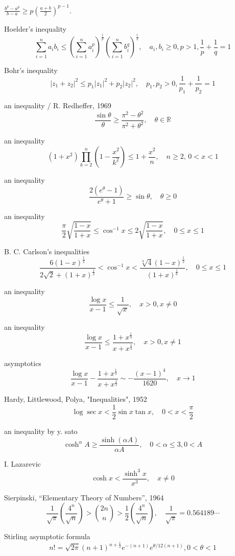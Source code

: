 $
\displaystyle \frac{b^p-a^p}{b-a} \ge p\left(\frac{a+b}{2}\right)^{p-1}.
$

Hoelder’s inequality
$$
\sum^n_{i=1}a_i b_i \le \left(\sum^n_{i=1}a_i^p\right)^{\frac{1}{p}}\left(\sum^n_{i=1}b_i^q\right)^{\frac{1}{q}}, \quad a_i,b_i\ge 0,p>1,\frac{1}{p}+\frac{1}{q}=1
$$

Bohr’s inequality
$$
|z_1+z_2|^2 \le p_1 |z_1|^2+p_2 |z_2|^2, \quad p_1,p_2>0,\frac{1}{p_1}+\frac{1}{p_2}=1
$$

an inequality / R. Redheffer, 1969
$$
\frac{\sin\theta}{\theta} \ge \frac{\pi^2-\theta^2}{\pi^2+\theta^2}, \quad \theta\in\mathbb{R}
$$

an inequality
$$
(1+x^2)\prod^n_{k=2}\left(1-\frac{x^2}{k^2}\right) \le 1+\frac{x^2}{n}, \quad n \ge 2,\, 0<x<1
$$

an inequality
$$
\frac{2(e^\theta-1)}{e^\theta+1} \ge \sin\theta, \quad \theta \ge 0
$$

an inequality
$$
\frac{\pi}{2}\sqrt{\frac{1-x}{1+x}} \le \cos^{-1}x \le 2 \sqrt{\frac{1-x}{1+x}}, \quad 0 \le x \le 1
$$

B. C. Carlson’s inequalities
$$
\frac{6(1-x)^{\frac{1}{2}}}{2\sqrt{2}+(1+x)^{\frac{1}{2}}}<\cos^{-1}x<\frac{\sqrt[3]{4}(1-x)^{\frac{1}{2}}}{(1+x)^{\frac{1}{6}}}, \quad 0 \le x \le 1
$$

an inequality 
$$
\frac{\log x}{x-1} \le \frac{1}{\sqrt{x}}, \quad x>0,x\ne 0
$$

an inequality
$$
\frac{\log x}{x-1} \le \frac{1+x^{\frac{1}{3}}}{x+x^{\frac{1}{3}}}, \quad x>0,x\ne 1
$$

asymptotics
$$
\frac{\log x}{x-1} - \frac{1+x^{\frac{1}{3}}}{x+x^{\frac{1}{3}}} \sim -\frac{(x-1)^4}{1620}, \quad x\rightarrow 1
$$

Hardy, Littlewood, Polya, "Inequalities", 1952
$$
\log \sec x< \frac{1}{2}\sin x\tan x , \quad 0<x<\frac{\pi}{2}
$$

an inequality by y. sato
$$
\cosh^\alpha A \ge \frac{\sinh(\alpha A)}{\alpha A}, \quad 0 <\alpha \le 3, 0< A
$$

I. Lazarevic
$$
\cosh x < \frac{\sinh^3 x}{x^3}, \quad x \ne 0
$$

Sierpinski, “Elementary Theory of Numbers”, 1964
$$
\frac{1}{\sqrt{\pi}}\left(\frac{4^n}{\sqrt{n}}\right)>\binom{2n}{n}>\frac{1}{2}\left(\frac{4^n}{\sqrt{n}}\right), \quad \frac{1}{\sqrt{\pi}}=0.564189\cdots
$$

Stirling asymptotic formula
$$
n! = \sqrt{2\pi}(n+1)^{n+\frac{1}{2}}e^{-(n+1)}e^{\theta/12(n+1)}, 0<\theta<1
$$

